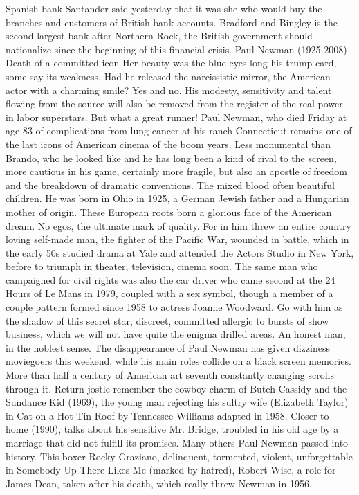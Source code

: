 Spanish bank Santander said yesterday that it was she who would buy the branches and customers of British bank accounts.
Bradford and Bingley is the second largest bank after Northern Rock, the British government should nationalize since the beginning of this financial crisis.
Paul Newman (1925-2008) - Death of a committed icon
Her beauty was the blue eyes long his trump card, some say its weakness.
Had he released the narcissistic mirror, the American actor with a charming smile?
Yes and no.
His modesty, sensitivity and talent flowing from the source will also be removed from the register of the real power in labor superstars.
But what a great runner!
Paul Newman, who died Friday at age 83 of complications from lung cancer at his ranch Connecticut remains one of the last icons of American cinema of the boom years.
Less monumental than Brando, who he looked like and he has long been a kind of rival to the screen, more cautious in his game, certainly more fragile, but also an apostle of freedom and the breakdown of dramatic conventions.
The mixed blood often beautiful children.
He was born in Ohio in 1925, a German Jewish father and a Hungarian mother of origin.
These European roots born a glorious face of the American dream.
No egos, the ultimate mark of quality.
For in him threw an entire country loving self-made man, the fighter of the Pacific War, wounded in battle, which in the early 50s studied drama at Yale and attended the Actors Studio in New York, before to triumph in theater, television, cinema soon.
The same man who campaigned for civil rights was also the car driver who came second at the 24 Hours of Le Mans in 1979, coupled with a sex symbol, though a member of a couple pattern formed since 1958 to actress Joanne Woodward.
Go with him as the shadow of this secret star, discreet, committed allergic to bursts of show business, which we will not have quite the enigma drilled areas.
An honest man, in the noblest sense.
The disappearance of Paul Newman has given dizziness moviegoers this weekend, while his main roles collide on a black screen memories.
More than half a century of American art seventh constantly changing scrolls through it.
Return jostle remember the cowboy charm of Butch Cassidy and the Sundance Kid (1969), the young man rejecting his sultry wife (Elizabeth Taylor) in Cat on a Hot Tin Roof by Tennessee Williams adapted in 1958.
Closer to home (1990), talks about his sensitive Mr. Bridge, troubled in his old age by a marriage that did not fulfill its promises.
Many others Paul Newman passed into history.
This boxer Rocky Graziano, delinquent, tormented, violent, unforgettable in Somebody Up There Likes Me (marked by hatred), Robert Wise, a role for James Dean, taken after his death, which really threw Newman in 1956.
